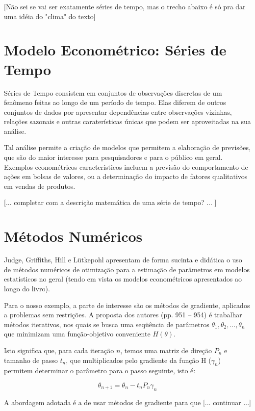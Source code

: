 \documentclass{abnt}
\begin{document}
[Não sei se vai ser exatamente séries de tempo, mas o trecho abaixo é só pra dar uma idéia do "clima" do texto]

\section {Modelo Econométrico: Séries de Tempo}

Séries de Tempo consistem em conjuntos de observações discretas de um fenômeno feitas ao longo de um período de tempo. Elas diferem de outros conjuntos de dados por apresentar dependências entre observações vizinhas, relações sazonais e outras caraterísticas únicas que podem ser aproveitadas na sua análise.

Tal análise permite a criação de modelos que permitem a elaboração de previsões, que são do maior interesse para pesquisadores e para o público em geral. Exemplos econométricos característicos incluem a previsão do comportamento de ações em bolsas de valores\cite{wikipedia:time_series}, ou a determinação do impacto de fatores qualitativos em vendas de produtos.

[... completar com a descrição matemática de uma série de tempo? ... ]



\section {Métodos Numéricos}

Judge, Griffiths, Hill e Lütkepohl\cite{judge} apresentam de forma sucinta e didática o uso de métodos numéricos de otimização para a estimação de parâmetros em modelos estatísticos no geral (tendo em vista os modelos econométricos apresentados ao longo do livro).

Para o nosso exemplo, a parte de interesse são os métodos de gradiente, aplicados a problemas sem restrições. A proposta dos autores (pp. 951 -- 954) é trabalhar métodos iterativos, nos quais se busca uma seqüência de parâmetros $\theta_{1}, \theta_{2}, ... , \theta_{n}$ que minimizam uma função-objetivo conveniente $H(\theta)$.

Isto significa que, para cada iteração $n$, temos uma matriz de direção $P_{n}$ e tamanho de passo $t_{n}$, que multiplicados pelo gradiente da função H ($\gamma_{n}$) permitem determinar o parâmetro para o passo seguinte, isto é:

\[ \theta_{n+1} = \theta_{n} - t_{n}P_{n}\gamma_{n} \]

A abordagem adotada é a de usar métodos de gradiente para que [... continuar ...]
\end{document}
